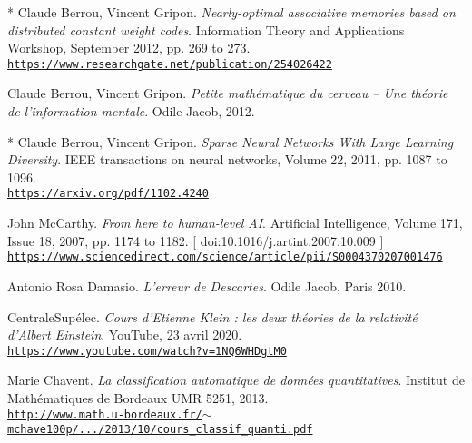 \vspace{-1cm}
\renewcommand{\refname}{}

\renewcommand\bibpreamble{$\rightarrow$ The references to go further or deeper for advanced readers are prepended by an asterisk.\bigskip}

\begin{thebibliography}{99}
		
	 * Claude Berrou, Vincent Gripon. \textit{Nearly-optimal associative memories based on distributed constant weight codes}. Information Theory and Applications Workshop, September 2012, pp. 269 to 273.\\ \href{https://www.researchgate.net/publication/254026422\_Nearly-optimal\_associative\_memories\_based\_on\_distributed\_constant\_weight\_codes}{\scriptsize{\texttt{https://www.researchgate.net/publication/254026422}}} \normalsize{}
	
	Claude Berrou, Vincent Gripon. \textit{Petite mathématique du cerveau -- Une théorie de l’information mentale}. Odile Jacob, 2012.
	
	 * Claude Berrou, Vincent Gripon. \textit{Sparse Neural Networks With Large Learning Diversity}. IEEE transactions on neural networks, Volume 22, 2011, pp. 1087 to 1096.\\ \href{https://arxiv.org/pdf/1102.4240}{\scriptsize{\texttt{https://arxiv.org/pdf/1102.4240}}} \normalsize{}
	 
	 John McCarthy. \textit{From here to human-level AI}. 
	 Artificial Intelligence, Volume 171, Issue 18, 2007, pp. 1174 to 1182. {\scriptsize [ doi:10.1016/j.artint.2007.10.009 ]}
	 \\ \href{https://www.sciencedirect.com/science/article/pii/S0004370207001476}{\scriptsize{\texttt{https://www.sciencedirect.com/science/article/pii/S0004370207001476}}} \normalsize{}
	 
	 Antonio Rosa Damasio. \textit{L'erreur de Descartes}. Odile Jacob, Paris 2010.
	 	 
	 CentraleSupélec. \textit{Cours d'Etienne Klein : les deux théories de la relativité d'Albert Einstein}. 
	 YouTube, 23 avril 2020. \\ \href{https://www.youtube.com/watch?v=1NQ6WHDgtM0}{\scriptsize{\texttt{https://www.youtube.com/watch?v=1NQ6WHDgtM0}}} \normalsize{}
	 
	 Marie Chavent. \textit{La classification automatique de données quantitatives}. 
	 Institut de Mathématiques de Bordeaux UMR 5251, 2013.\\ \href{http://www.math.u-bordeaux.fr/\~mchave100p/wordpress/wp-content/uploads/2013/10/cours\_classif\_quanti.pdf}{\scriptsize{\texttt{http://www.math.u-bordeaux.fr/$\sim$mchave100p/.../2013/10/cours\_classif\_quanti.pdf}}} \normalsize{}
	 

\end{thebibliography}
